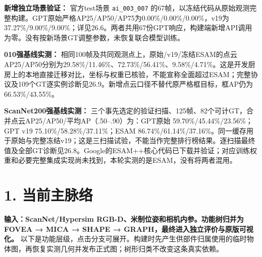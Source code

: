 \documentclass[UTF8,fontset=fandol]{ctexart}
\begin{document}
\textbf{新增独立场景验证：} 官方test场景 \texttt{ai\_\allowbreak{}003\_\allowbreak{}007} 的67帧，以冻结代码从原始观测完整构建。GPT原始严格AP25/AP50/AP75为0.00\%/0.00\%/0.00\%，v19为37.27\%/9.00\%/9.00\%；详见26.6。两者共用67份GPT响应，构建端新增API调用为零。没有按新场景GT调整参数，未恢复联合模型训练。



\textbf{010强基线实测：} 相同100帧及共同观测点上，原始/v19/冻结ESAM的点云AP25/AP50分别为29.58\%/11.46\%、72.73\%/56.41\%、9.58\%/4.71\%。这是开发厨房上的本地直接迁移对比，坐标与权重已核验，不能宣称全面超过ESAM；完整协议及109个GT逐实例诊断见26.9。新增点云口径不替代原严格框目标，框AP仍为66.53\%/43.55\%。



\textbf{ScanNet200强基线实测：} 三个事先选定的验证扫描、125帧、82个可计GT，合并点云AP25/AP50/平均AP（.50–.90）为：GPT原始 59.70\%/45.44\%/23.56\%；GPT v19 75.10\%/58.28\%/37.11\%；ESAM 86.74\%/61.14\%/37.16\%。同一缓存用于原始与完整冻结v19；这是三扫描试验，不能当作完整排行榜结果。逐扫描最终值及全部GT诊断见26.8。Google的ESAM++核心代码已下载并验证；对应训练权重和必要完整集成实现尚未找到，本轮实测的是ESAM，没有将两者混用。



\section*{1. 当前主脉络}

\textbf{输入：ScanNet/Hypersim RGB-D、米制位姿和相机内参。功能树归并为 FOVEA → MICA → SHAPE → GRAPH，最终进入独立评价与原版可视化。} 以下是功能层级，点击分支可展开。构建时先产生供部件归属使用的临时物体图，再恢复实测几何并发布正式图；树形归类不改变这条真实依赖。
\end{document}
